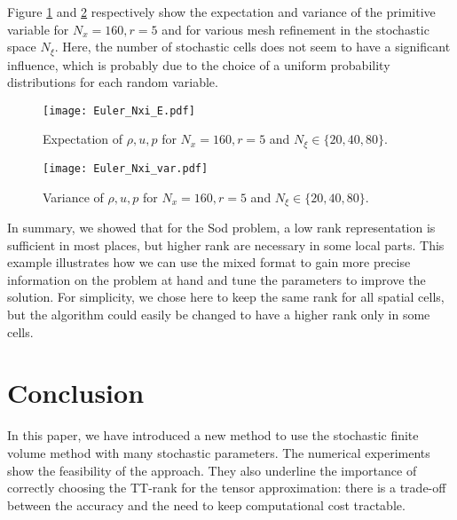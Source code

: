 \documentclass{article}
\begin{document}
Figure \ref{fig:Euler_Nxi} and \ref{fig:Euler_Nxi_var} respectively show the expectation and variance of the primitive variable
for $N_x=160,r=5$ and for various mesh refinement in the stochastic space $N_\xi$.
Here, the number of stochastic cells does not seem to have a significant influence, which is probably due to the choice of a uniform probability distributions for each random variable. 
\begin{figure}
    \centering
    \texttt{[image: Euler\_Nxi\_E.pdf]}
    \caption{Expectation of $\rho, u, p$ for $N_x=160, r=5$ and $N_\xi\in \{20,40,80\}$.}
    \label{fig:Euler_Nxi}
\end{figure}
\begin{figure}
    \centering
    \texttt{[image: Euler\_Nxi\_var.pdf]}
    \caption{Variance of $\rho, u, p$ for $N_x=160, r=5$ and $N_\xi \in \{20,40,80\}$.}
    \label{fig:Euler_Nxi_var}
\end{figure}


In summary, we showed that for the Sod problem, a low rank representation is sufficient in most places, but higher rank are necessary in some local parts. 
This example illustrates how we can use the mixed format to gain more precise information on the problem at hand and tune the parameters to improve the solution. 
For simplicity, we chose here to keep the same rank for all spatial cells, but the algorithm could easily be changed to have a higher rank only in some cells. 



\section{Conclusion}
In this paper, we have introduced a new method to use the stochastic finite volume method with many stochastic parameters.
The numerical experiments show the feasibility of the approach. 
They also underline the importance of correctly choosing the TT-rank for the tensor approximation: there is a trade-off between the accuracy and the need to keep computational cost tractable. 
\end{document}
